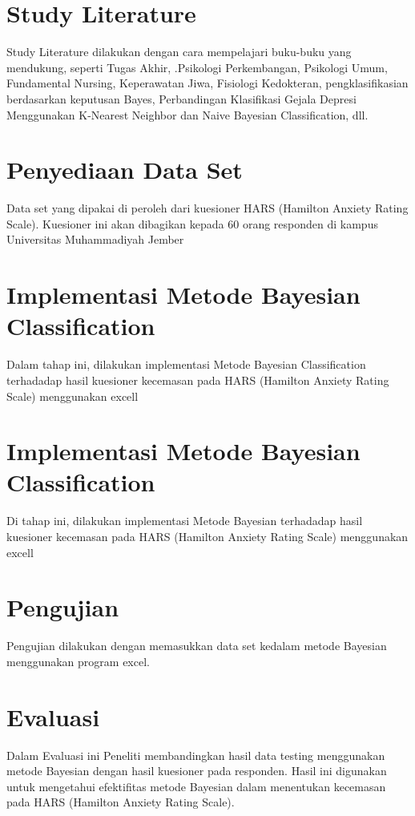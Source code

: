 \documentclass{jtetiproposalskripsi}
\begin{document}
\vspace{-0.5cm}

\section{Study Literature}
Study Literature dilakukan dengan cara mempelajari buku-buku yang mendukung, seperti Tugas Akhir, .Psikologi Perkembangan, Psikologi Umum, Fundamental Nursing, Keperawatan Jiwa, Fisiologi Kedokteran, pengklasifikasian berdasarkan keputusan Bayes, Perbandingan Klasifikasi Gejala Depresi Menggunakan K-Nearest Neighbor dan Naive Bayesian Classification, dll.

\section{Penyediaan Data Set} 
Data set yang dipakai di peroleh dari kuesioner HARS (Hamilton Anxiety Rating Scale). Kuesioner ini akan dibagikan kepada 60 orang responden di kampus Universitas Muhammadiyah Jember

\section{Implementasi Metode Bayesian Classification} 
Dalam tahap ini, dilakukan implementasi Metode Bayesian Classification terhadadap hasil kuesioner kecemasan pada HARS (Hamilton Anxiety Rating Scale) menggunakan excell



\section{Implementasi Metode Bayesian Classification}
Di tahap ini, dilakukan implementasi Metode Bayesian  terhadadap hasil kuesioner kecemasan pada HARS (Hamilton Anxiety Rating Scale) menggunakan excell

\section{Pengujian}
Pengujian dilakukan dengan memasukkan data set kedalam metode Bayesian menggunakan program excel.

\section{Evaluasi}
Dalam Evaluasi ini Peneliti membandingkan hasil data testing menggunakan metode Bayesian dengan hasil kuesioner pada responden. Hasil ini digunakan untuk mengetahui efektifitas metode Bayesian dalam menentukan kecemasan pada HARS (Hamilton Anxiety Rating Scale).
\end{document}
